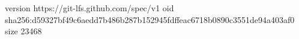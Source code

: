 version https://git-lfs.github.com/spec/v1
oid sha256:d59327bf49c6aedd7b486b287b152945fdffeac6718b0890c3551de94a403af0
size 23468
